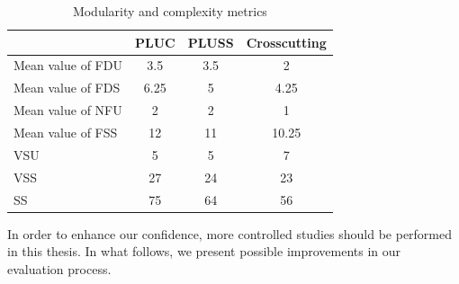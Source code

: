 \documentclass[times, 11pt,twocolumn]{article}
\begin{document}
\begin{table}[htb]
\centering
\caption{Modularity and complexity metrics}
\label{tab:metrics}
\begin{small}
\begin{tabular}{lccc} \hline
					    & PLUC 	& PLUSS 	& Crosscutting	\\ \hline
Mean value of FDU 		& 3.5	& 3.5	& 2					\\
Mean value of FDS 		& 6.25	& 5		& 4.25				\\
Mean value of NFU 		& 2		& 2		& 1					\\
Mean value of FSS 		& 12	& 11	& 10.25				\\ 
VSU 					& 5		& 5		& 7					\\
VSS 					& 27	& 24	& 23				\\
SS 					    & 75	& 64	& 56				\\	\hline
\end{tabular}
\end{small}
\end{table}



In order to enhance our confidence, more controlled studies should be performed
in this thesis. In what follows, we present possible improvements in our evaluation
process.

% 
\end{document}
